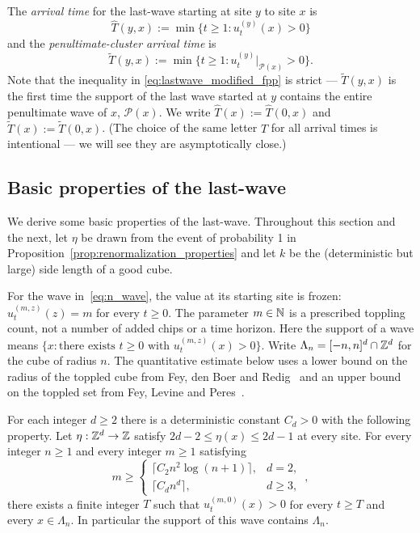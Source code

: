 \documentclass[12pt]{amsart}
\begin{document}
The {\it arrival time} for the last-wave starting at site $y$ to site $x$ is
\begin{equation} \label{eq:lastwave_fpp}
\hat{T}(y,x) := \min\{ t \geq 1 : u_{t}^{(y)}(x) > 0\}
\end{equation}
and the {\it penultimate-cluster arrival time} is 
\begin{equation} \label{eq:lastwave_modified_fpp}
\tilde{T}(y,x) := \min\{ t \geq 1 : u_{t}^{(y)}|_{\mathcal{P}(x)} > 0\}. 
\end{equation}
Note that the inequality in \eqref{eq:lastwave_modified_fpp} is strict --- $\tilde{T}(y,x)$ is the first time
the support of the last wave started at $y$ contains the entire penultimate wave of $x$, $\mathcal{P}(x)$. 
We write $\hat{T}(x) := \hat{T}(0,x)$ and $\tilde{T}(x) := \tilde{T}(0,x)$.
(The choice of the same letter $T$ for all arrival times is intentional --- we will see they are asymptotically close.)

\subsection{Basic properties of the last-wave} \label{sec:last_wave_basic_properties}
We derive some basic properties of the last-wave. Throughout this section and the next, let $\eta$ be drawn from the event of probability 1 in Proposition~\ref{prop:renormalization_properties} and let $k$ be the (deterministic but large) side length of a good cube.

For the wave in~\eqref{eq:n_wave}, the value at its starting site is frozen: $u_t^{(m,z)}(z)=m$ for every $t\geq0$. The parameter $m\in\mathbb{N}$ is a prescribed toppling count, not a number of added chips or a time horizon. Here the support of a wave means $\{x:\text{there exists }t\geq0\text{ with }u_t^{(m,z)}(x)>0\}$. Write $\Lambda_n=[-n,n]^d\cap\mathbb{Z}^d$ for the cube of radius $n$. The quantitative estimate below uses a lower bound on the radius of the toppled cube from Fey, den Boer and Redig~\cite{fey2008limiting} and an upper bound on the toppled set from Fey, Levine and Peres~\cite{fey2010growth}.

\begin{lemma}\label{lemma:square_lower_bound}
For each integer $d\geq2$ there is a deterministic constant $C_d>0$ with the following property. Let $\eta:\mathbb{Z}^d\to\mathbb{Z}$ satisfy $2d-2\leq\eta(x)\leq2d-1$ at every site. For every integer $n\geq1$ and every integer $m\geq1$ satisfying
\begin{equation*}
 m\geq
 \begin{cases}
 \lceil C_2 n^2\log(n+1)\rceil,&d=2,\\
 \lceil C_d n^d\rceil,&d\geq3,
 \end{cases}\,,
\end{equation*}
there exists a finite integer $T$ such that $u_t^{(m,0)}(x)>0$ for every $t\geq T$ and every $x\in\Lambda_n$. In particular the support of this wave contains $\Lambda_n$.
\end{lemma}
\end{document}
